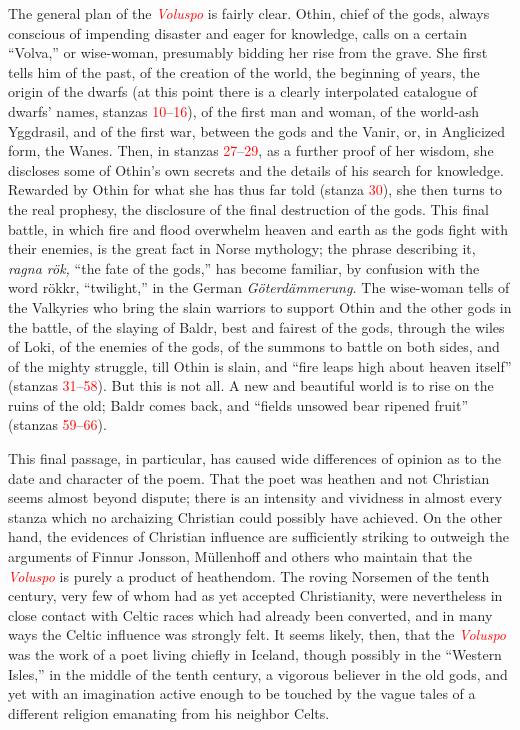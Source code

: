 \documentclass{scrbook}
\makeatletter
\newcommand{\ndash}{--}
\newcommand{\thischapterlabel}{Stub value, should not see it}
\newcommand{\chapterref}[1]{\textcolor{red}{\emph{#1}}}
\newcommand{\stanzaref}[2][\@empty]{\textcolor{red}{#2}}
\newcommand{\chapterref}[1]{\hyperref[cha:#1]{\emph{#1}}}
\newcommand{\stanzaref}[2][\@empty]{\ifx\@empty#1\hyperref[\thischapterlabel:#2]{#2}\else\hyperref[cha:#1:#2]{#2}\fi}
\newcommand{\stanzarangeref}[3][\@empty]{\stanzaref[#1]{#2}\ndash\stanzaref[#1]{#3}}
\makeatother
\begin{document}
The general plan of the \chapterref{Voluspo} is fairly clear. Othin, chief of the gods, always conscious of impending disaster and eager for knowledge, calls on a certain ``Volva,'' or wise-woman, presumably bidding her rise from the grave. She first tells him of the past, of the creation of the world, the beginning of years, the origin of the dwarfs (at this point there is a clearly interpolated catalogue of dwarfs' names, stanzas \stanzarangeref{10}{16}), of the first man and woman, of the world-ash Yggdrasil, and of the first war, between the gods and the Vanir, or, in Anglicized form, the Wanes. Then, in stanzas \stanzarangeref{27}{29}, as a further proof of her wisdom, she discloses some of Othin's own secrets and the details of his search for knowledge. Rewarded by Othin for what she has thus far told (stanza \stanzaref{30}), she then turns to the real prophesy, the disclosure of the final destruction of the gods. This final battle, in which fire and flood overwhelm heaven and earth as the gods fight with their enemies, is the great fact in Norse mythology; the phrase describing it, \emph{ragna rök,} ``the fate of the gods,'' has become familiar, by confusion with the word rökkr, ``twilight,'' in the German \emph{Göterdämmerung.} The wise-woman tells of the Valkyries who bring the slain warriors to support Othin and the other gods in the battle, of the slaying of Baldr, best and fairest of the gods, through the wiles of Loki, of the enemies of the gods, of the summons to battle on both sides, and of the mighty struggle, till Othin is slain, and ``fire leaps high about heaven itself'' (stanzas \stanzarangeref{31}{58}). But this is not all. A new and beautiful world is to rise on the ruins of the old; Baldr comes back, and ``fields unsowed bear ripened fruit'' (stanzas \stanzarangeref{59}{66}).

This final passage, in particular, has caused wide differences of opinion as to the date and character of the poem. That the poet was heathen and not Christian seems almost beyond dispute; there is an intensity and vividness in almost every stanza which no archaizing Christian could possibly have achieved. On the other hand, the evidences of Christian influence are sufficiently striking to outweigh the arguments of Finnur Jonsson, Müllenhoff and others who maintain that the \chapterref{Voluspo} is purely a product of heathendom. The roving Norsemen of the tenth century, very few of whom had as yet accepted Christianity, were nevertheless in close contact with Celtic races which had already been converted, and in many ways the Celtic influence was strongly felt. It seems likely, then, that the \chapterref{Voluspo} was the work of a poet living chiefly in Iceland, though possibly in the ``Western Isles,'' in the middle of the tenth century, a vigorous believer in the old gods, and yet with an imagination active enough to be touched by the vague tales of a different religion emanating from his neighbor Celts.
\end{document}
